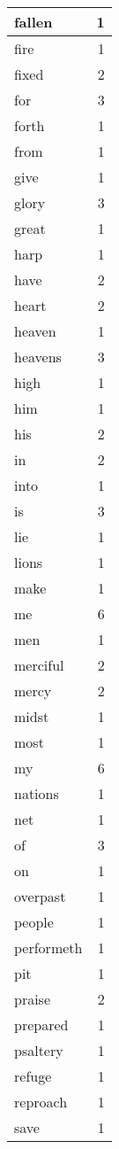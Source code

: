 \begin{center}
\begin{longtable}{l|r}
fallen & 1 \\ \hline
fire & 1 \\ \hline
fixed & 2 \\ \hline
for & 3 \\ \hline
forth & 1 \\ \hline
from & 1 \\ \hline
give & 1 \\ \hline
glory & 3 \\ \hline
great & 1 \\ \hline
harp & 1 \\ \hline
have & 2 \\ \hline
heart & 2 \\ \hline
heaven & 1 \\ \hline
heavens & 3 \\ \hline
high & 1 \\ \hline
him & 1 \\ \hline
his & 2 \\ \hline
in & 2 \\ \hline
into & 1 \\ \hline
is & 3 \\ \hline
lie & 1 \\ \hline
lions & 1 \\ \hline
make & 1 \\ \hline
me & 6 \\ \hline
men & 1 \\ \hline
merciful & 2 \\ \hline
mercy & 2 \\ \hline
midst & 1 \\ \hline
most & 1 \\ \hline
my & 6 \\ \hline
nations & 1 \\ \hline
net & 1 \\ \hline
of & 3 \\ \hline
on & 1 \\ \hline
overpast & 1 \\ \hline
people & 1 \\ \hline
performeth & 1 \\ \hline
pit & 1 \\ \hline
praise & 2 \\ \hline
prepared & 1 \\ \hline
psaltery & 1 \\ \hline
refuge & 1 \\ \hline
reproach & 1 \\ \hline
save & 1 \\ \hline

\end{longtable}
\end{center}
